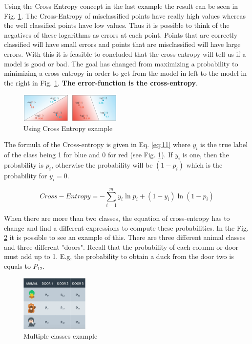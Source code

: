 \documentclass{article}
\begin{document}
Using the Cross Entropy concept in the last example the result can be seen in Fig. \ref{fig:f23}. The Cross-Entropy of misclassified points have really high values whereas the well classified points have low values. Thus it is possible to think of the negatives of these logarithms as errors at each point. Points that are correctly classified will have small errors and points that are misclassified will have large errors. With this it is feasible to concluded that the cross-entropy will tell us if a model is good or bad. The goal has changed from maximizing a probability to minimizing a cross-entropy in order to get from the model in left to the model in the right in Fig. \ref{fig:f23}. \textbf{The error-function is the cross-entropy}.

\begin{figure}[ht]
    \centering
    \includegraphics[width=0.45\textwidth,height=0.45\textheight,keepaspectratio]{images/cross_entrophy.png}
    \captionsetup{justification=centering}
    \caption{Using Cross Entropy example}
    \label{fig:f23}
\end{figure}

The formula of the Cross-entropy is given in Eq. \eqref{eq:11} where \(y_i\) is the true label of the class being 1 for blue and 0 for red (see Fig. \ref{fig:f23}). If \(y_i\) is one, then the probability is \(p_i\), otherwise the probability will be \((1 - p_i)\) which is the probability for \(y_i = 0\).

\begin{equation}
\label{eq:11}
Cross-Entropy = - \sum_{i = 1}^m y_i \ln{p_i} + (1 - y_i) \ln{(1 - p_i)}
\end{equation} 

When there are more than two classes, the equation of cross-entropy has to change and find a different expressions to compute these probabilities. In the Fig. \ref{fig:f24} it is possible to see an example of this. There are three different animal classes and three different "doors". Recall that the probability of each column or door must add up to 1. E.g, the probability to obtain a duck from the door two is equals to \(P_{12}\).

\begin{figure}[ht]
    \centering
    \includegraphics[width=0.3\textwidth,height=0.3\textheight,keepaspectratio]{images/multiple_classes.png}
    \captionsetup{justification=centering}
    \caption{Multiple classes example}
    \label{fig:f24}
\end{figure}
\end{document}
